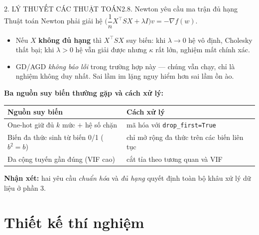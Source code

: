 \documentclass[aspectratio=169,11pt]{beamer}
\newcommand{\nx}{\textbf{Nhận xét:}}
\begin{document}
\begin{frame}{2. LÝ THUYẾT CÁC THUẬT TOÁN}{2.8. Newton yêu cầu ma trận đủ hạng}
  \small
  Thuật toán Newton phải giải hệ $\Big(\dfrac1n X^\top S X+\lambda I\Big)v=-\nabla f(w)$.
  \begin{itemize}
    \item Nếu $X$ \textbf{không đủ hạng} thì $X^\top S X$ suy biến: khi $\lambda\to0$ hệ vô định,
          Cholesky thất bại; khi $\lambda>0$ hệ vẫn giải được nhưng $\kappa$ rất lớn, nghiệm mất chính xác.
    \item GD/AGD \emph{không báo lỗi} trong trường hợp này — chúng vẫn chạy, chỉ là nghiệm không duy nhất.
          Sai lầm im lặng nguy hiểm hơn sai lầm ồn ào.
  \end{itemize}
  \vspace{6pt}
  \textbf{Ba nguồn suy biến thường gặp và cách xử lý:}
  \begin{center}
  \begin{tabular}{ll}
    \toprule
    Nguồn suy biến & Cách xử lý\\
    \midrule
    One-hot giữ đủ $k$ mức $+$ hệ số chặn & mã hóa với \texttt{drop\_first=True}\\
    Biến đa thức sinh từ biến 0/1 ($b^2=b$) & chỉ mở rộng đa thức trên các biến liên tục\\
    Đa cộng tuyến gần đúng (VIF cao) & cắt tỉa theo tương quan và VIF\\
    \bottomrule
  \end{tabular}
  \end{center}
  \vspace{4pt}
  \nx{} hai yêu cầu \emph{chuẩn hóa} và \emph{đủ hạng} quyết định toàn bộ khâu xử lý dữ liệu ở phần 3.
\end{frame}

\section{Thiết kế thí nghiệm}
\end{document}
